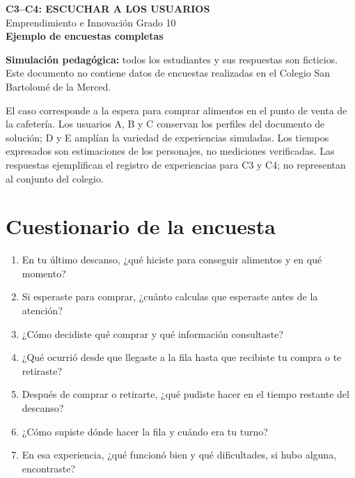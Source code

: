 \documentclass[12pt]{article}
\begin{document}
\raggedbottom
\color{black}
\begin{center}
{\Large\bfseries C3--C4: ESCUCHAR A LOS USUARIOS}\\[1mm]
Emprendimiento e Innovación Grado 10\\[1mm]
\textbf{Ejemplo de encuestas completas}
\end{center}
\textbf{Simulación pedagógica:} todos los estudiantes y sus respuestas son ficticios. Este documento no contiene datos de encuestas realizadas en el Colegio San Bartolomé de la Merced.

\smallskip
El caso corresponde a la espera para comprar alimentos en el punto de venta de la cafetería. Los usuarios A, B y C conservan los perfiles del documento de solución; D y E amplían la variedad de experiencias simuladas. Los tiempos expresados son estimaciones de los personajes, no mediciones verificadas. Las respuestas ejemplifican el registro de experiencias para C3 y C4; no representan al conjunto del colegio.

\section{Cuestionario de la encuesta}
\begin{enumerate}
\item En tu último descanso, ¿qué hiciste para conseguir alimentos y en qué momento?
\item Si esperaste para comprar, ¿cuánto calculas que esperaste antes de la atención?
\item ¿Cómo decidiste qué comprar y qué información consultaste?
\item ¿Qué ocurrió desde que llegaste a la fila hasta que recibiste tu compra o te retiraste?
\item Después de comprar o retirarte, ¿qué pudiste hacer en el tiempo restante del descanso?
\item ¿Cómo supiste dónde hacer la fila y cuándo era tu turno?
\item En esa experiencia, ¿qué funcionó bien y qué dificultades, si hubo alguna, encontraste?
\end{enumerate}
\newpage
\end{document}

